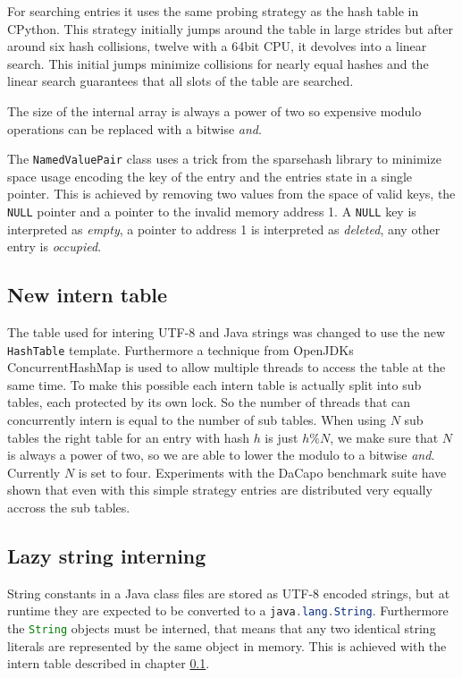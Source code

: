 \documentclass[12pt,a4paper,oneside]{article}
\newcommand{\cpp}[1]{\lstinline[language=C++]{#1}}
\newcommand{\java}[1]{\lstinline[language=Java]{#1}}
\begin{document}
	For searching entries it uses the same probing strategy as the hash table in CPython\cite{pydict}.
	This strategy initially jumps around the table in large strides but after around six hash collisions, twelve with a 64bit CPU,
	it devolves into a linear search.
	This initial jumps minimize collisions for nearly equal hashes and the linear search guarantees that all slots of the table 
	are searched.

	The size of the internal array is always a power of two so expensive modulo operations can be replaced with a bitwise \emph{and}.

	The \cpp{NamedValuePair} class uses a trick from the sparsehash\cite{sparsehash} library to minimize space usage encoding
	the key of the entry and the entries state in a single pointer.
	This is achieved by removing two values from the space of valid keys, the \cpp{NULL} pointer and a pointer to the invalid
	memory address 1.
	A \cpp{NULL} key is interpreted as \emph{empty}, a pointer to address 1 is interpreted as \emph{deleted}, any other
	entry is \emph{occupied}.

\subsection{New intern table}
\label{intern_table}
	The table used for intering UTF-8 and Java strings was changed to use the new \cpp{HashTable} template.
	Furthermore a technique from OpenJDKs ConcurrentHashMap\cite{ConcurrentHashMap} is used to allow multiple threads
	to access the table at the same time.
	To make this possible each intern table is actually split into sub tables, each protected by its own lock.
	So the number of threads that can concurrently intern is equal to the number of sub tables.
	When using $N$ sub tables the right table for an entry with hash $h$ is just $h\%N$, we make sure that $N$ is always a 
	power of two, so we are able to lower the modulo to a bitwise \emph{and}.
	Currently $N$ is set to four.
	Experiments with the DaCapo benchmark suite\cite{DaCapo} have shown that even with this simple strategy entries are distributed 
	very equally accross the sub tables.

\subsection{Lazy string interning}
	String constants in a Java class files are stored as UTF-8 encoded strings, but at runtime they are expected to be converted to a 
	\java{java.lang.String}.
	Furthermore the \java{String} objects must be interned, that means that any two identical string literals are represented by
	the same object in memory.
	This is achieved with the intern table described in chapter \ref{intern_table}.
\end{document}
